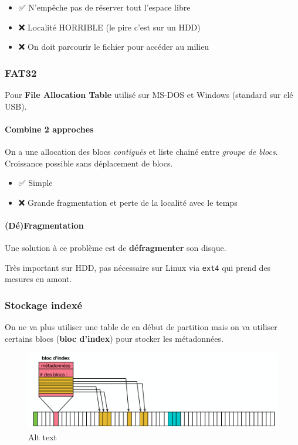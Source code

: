 \begin{itemize}
\tightlist
\item
  ✅ N'empêche pas de réserver tout l'espace libre
\item
  ❌ Localité HORRIBLE (le pire c'est sur un HDD)
\item
  ❌ On doit parcourir le fichier pour accéder au milieu
\end{itemize}

\subsubsection{FAT32}\label{fat32}

Pour \textbf{File Allocation Table} utilisé sur MS-DOS et Windows
(standard sur clé USB).

\paragraph{Combine 2 approches}\label{combine-2-approches}

On a une allocation des blocs \emph{contiguës} et liste chainé entre
\emph{groupe de blocs}. Croissance possible sans déplacement de blocs.

\begin{itemize}
\tightlist
\item
  ✅ Simple
\item
  ❌ Grande fragmentation et perte de la localité avec le temps
\end{itemize}

\paragraph{(Dé)Fragmentation}\label{duxe9fragmentation}

Une solution à ce problème est de \textbf{défragmenter} son disque.

Très important sur HDD, pas nécessaire sur Linux via \texttt{ext4} qui
prend des mesures en amont.

\subsubsection{Stockage indexé}\label{stockage-indexuxe9}

On ne va plus utiliser une table de en début de partition mais on va
utiliser certains blocs (\textbf{bloc d'index}) pour stocker les
métadonnées.

\begin{figure}
\centering
\includegraphics{image-43.png}
\caption{Alt text}
\end{figure}

